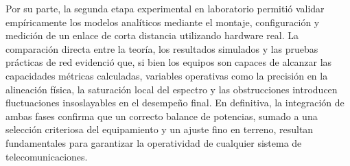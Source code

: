 \documentclass[12pt]{article}
\begin{document}
Por su parte, la segunda etapa experimental en laboratorio permitió validar empíricamente los modelos analíticos mediante el montaje, configuración y medición de un enlace de corta distancia utilizando hardware real. La comparación directa entre la teoría, los resultados simulados y las pruebas prácticas de red evidenció que, si bien los equipos son capaces de alcanzar las capacidades métricas calculadas, variables operativas como la precisión en la alineación física, la saturación local del espectro y las obstrucciones introducen fluctuaciones insoslayables en el desempeño final. En definitiva, la integración de ambas fases confirma que un correcto balance de potencias, sumado a una selección criteriosa del equipamiento y un ajuste fino en terreno, resultan fundamentales para garantizar la operatividad de cualquier sistema de telecomunicaciones. 



\newpage
\nocite{*}

\newpage
\printbibliography[heading=bibintoc, title={5. Bibliografía y Referencias}]
\end{document}
